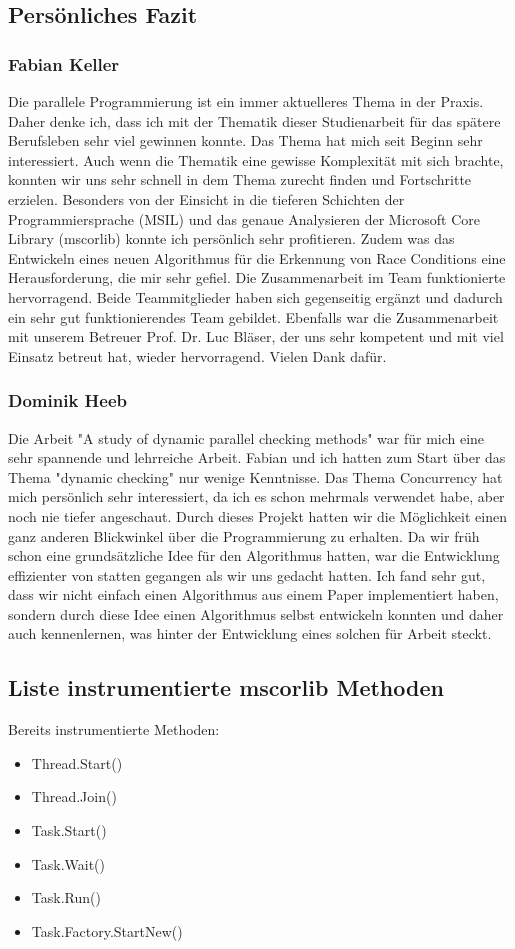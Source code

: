 \documentclass[10pt,a4paper]{article}
\begin{document}
\subsection*{Persönliches Fazit}
\subsubsection*{Fabian Keller}
Die parallele Programmierung ist ein immer aktuelleres Thema in der Praxis. Daher denke ich, dass ich mit der Thematik dieser Studienarbeit für das spätere Berufsleben sehr viel gewinnen konnte. Das Thema  hat mich seit Beginn sehr interessiert. Auch wenn die Thematik eine gewisse Komplexität mit sich brachte, konnten wir uns sehr schnell in dem Thema zurecht finden und Fortschritte erzielen. Besonders von der Einsicht in die tieferen Schichten der Programmiersprache (MSIL) und das genaue Analysieren der Microsoft Core Library (mscorlib) konnte ich persönlich sehr profitieren. Zudem was das Entwickeln eines neuen Algorithmus für die Erkennung von Race Conditions eine Herausforderung, die mir sehr gefiel. Die Zusammenarbeit im Team funktionierte hervorragend. Beide Teammitglieder haben sich gegenseitig ergänzt und dadurch ein sehr gut funktionierendes Team gebildet. Ebenfalls war die Zusammenarbeit mit unserem Betreuer Prof. Dr. Luc Bläser, der uns sehr kompetent und mit viel Einsatz betreut hat, wieder hervorragend. Vielen Dank dafür.\\
\subsubsection*{Dominik Heeb}
Die Arbeit "A study of dynamic parallel checking methods" war für mich eine sehr spannende und lehrreiche Arbeit. Fabian und ich hatten zum Start über das Thema "dynamic checking" nur wenige Kenntnisse. Das Thema Concurrency hat mich persönlich sehr interessiert, da ich es schon mehrmals verwendet habe, aber noch nie tiefer angeschaut. Durch dieses Projekt hatten wir die Möglichkeit einen ganz anderen Blickwinkel über die Programmierung zu erhalten. Da wir früh schon eine grundsätzliche Idee für den Algorithmus hatten, war die Entwicklung effizienter von statten gegangen als wir uns gedacht hatten. Ich fand sehr gut, dass wir nicht einfach einen Algorithmus aus einem Paper implementiert haben, sondern durch diese Idee einen Algorithmus selbst entwickeln konnten und daher auch kennenlernen, was hinter der Entwicklung eines solchen für Arbeit steckt.
\subsection*{Liste instrumentierte mscorlib Methoden}\label{sec:instrumentierte_methoden}
Bereits instrumentierte Methoden:
\begin{itemize}
\setlength\itemsep{0em}
\item Thread.Start()
\item Thread.Join()
\item Task.Start()
\item Task.Wait()
\item Task.Run()
\item Task.Factory.StartNew()
\end{itemize}
\end{document}
